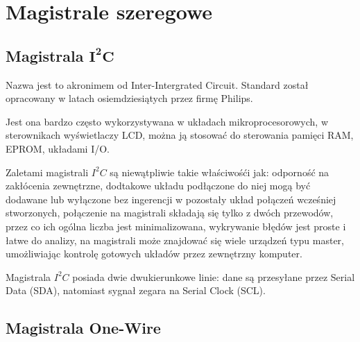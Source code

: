 \chapter{Magistrale szeregowe}

\section{Magistrala $\mathbf{I^{2}C}$}
Nazwa jest to akronimem od Inter-Intergrated Circuit. Standard został opracowany w latach osiemdziesiątych przez firmę Philips.

Jest ona bardzo często wykorzystywana w układach mikroprocesorowych, w sterownikach wyświetlaczy LCD, można ją stosować do sterowania pamięci RAM, EPROM, układami I/O.

Zaletami magistrali $I^{2}C$ są niewątpliwie takie właściwośći jak: odporność na zakłócenia zewnętrzne, dodtakowe układu podłączone do niej mogą być dodawane lub wyłączone bez ingerencji w pozostały układ połączeń wcześniej stworzonych, połączenie na magistrali składają się tylko z dwóch przewodów, przez co ich ogólna liczba jest minimalizowana, wykrywanie błędów jest proste i łatwe do analizy, na magistrali może znajdować się wiele urządzeń typu master, umożliwiając kontrolę gotowych układów przez zewnętrzny komputer.

Magistrala $I^{2}C$ posiada dwie dwukierunkowe linie: dane są przesyłane przez Serial Data (SDA), natomiast sygnał zegara na Serial Clock (SCL). 

\section{Magistrala One-Wire}